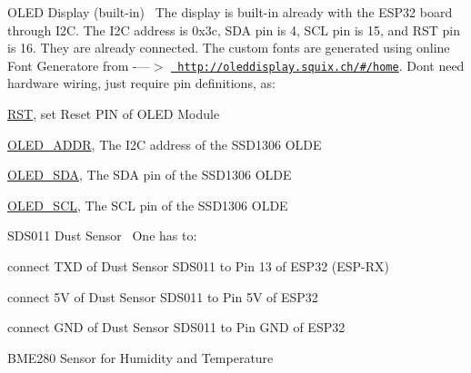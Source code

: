 \begin{DoxyEnumerate}
\item O\+L\+ED Display (built-\/in)~\newline
 The display is built-\/in already with the E\+S\+P32 board through I2C. The I2C address is 0x3c, S\+DA pin is 4, S\+CL pin is 15, and R\+ST pin is 16. They are already connected. The custom fonts are generated using online Font Generatore from -\/---$>$ \href{http://oleddisplay.squix.ch/\#/home}{\texttt{ http\+://oleddisplay.\+squix.\+ch/\#/home}}. Don\textquotesingle{}t need hardware wiring, just require pin definitions, as\+:
\begin{DoxyItemize}
\item \mbox{\hyperlink{main_8h_ac5d957e4fd3dc11cd97a54cf9ca057a4}{R\+ST}}, set Reset P\+IN of O\+L\+ED Module
\item \mbox{\hyperlink{main_8h_a7dfa2c4cfbfcba36416046052e7943e8}{O\+L\+E\+D\+\_\+\+A\+D\+DR}}, The I2C address of the S\+S\+D1306 O\+L\+DE
\item \mbox{\hyperlink{main_8h_afbf31d4d5bad7fd61418b8b8036df96c}{O\+L\+E\+D\+\_\+\+S\+DA}}, The S\+DA pin of the S\+S\+D1306 O\+L\+DE
\item \mbox{\hyperlink{main_8h_ad3ddbbb48cad4c34406916e199b89122}{O\+L\+E\+D\+\_\+\+S\+CL}}, The S\+CL pin of the S\+S\+D1306 O\+L\+DE
\end{DoxyItemize}
\item S\+D\+S011 Dust Sensor~\newline
 One has to\+:
\begin{DoxyItemize}
\item connect T\+XD of Dust Sensor S\+D\+S011 to Pin 13 of E\+S\+P32 (E\+S\+P-\/\+RX)
\item connect 5V of Dust Sensor S\+D\+S011 to Pin 5V of E\+S\+P32
\item connect G\+ND of Dust Sensor S\+D\+S011 to Pin G\+ND of E\+S\+P32
\end{DoxyItemize}
\item B\+M\+E280 Sensor for Humidity and Temperature~\newline


\end{DoxyEnumerate}

